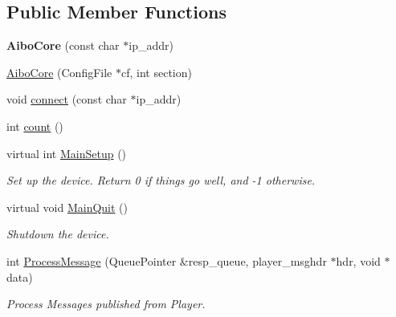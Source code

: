 \subsection*{Public Member Functions}
\begin{DoxyCompactItemize}
\item 
\hypertarget{classAiboCore_a673c057ac82df3fc6c0d828a98408bea}{
{\bfseries AiboCore} (const char $\ast$ip\_\-addr)}
\label{classAiboCore_a673c057ac82df3fc6c0d828a98408bea}

\item 
\hyperlink{classAiboCore_a377640056394d6235609688045288fe7}{AiboCore} (ConfigFile $\ast$cf, int section)
\item 
void \hyperlink{classAiboCore_a078c3b2541d57e7455094ef7c9e46c80}{connect} (const char $\ast$ip\_\-addr)
\item 
int \hyperlink{classAiboCore_a7cf6b6a288291b36254dc29ae089d6bc}{count} ()
\item 
virtual int \hyperlink{classAiboCore_a940aa3f41c521cfc8e1ea69b8a616648}{MainSetup} ()
\begin{DoxyCompactList}\small\item\em Set up the device. Return 0 if things go well, and -\/1 otherwise. \item\end{DoxyCompactList}\item 
\hypertarget{classAiboCore_a4a06b4d7957998e00ffa662ff9345662}{
virtual void \hyperlink{classAiboCore_a4a06b4d7957998e00ffa662ff9345662}{MainQuit} ()}
\label{classAiboCore_a4a06b4d7957998e00ffa662ff9345662}

\begin{DoxyCompactList}\small\item\em Shutdown the device. \item\end{DoxyCompactList}\item 
int \hyperlink{classAiboCore_a2612cdb01d22f3b18fa0c42ec15b4525}{ProcessMessage} (QueuePointer \&resp\_\-queue, player\_\-msghdr $\ast$hdr, void $\ast$data)
\begin{DoxyCompactList}\small\item\em Process Messages published from Player. \item\end{DoxyCompactList}\end{DoxyCompactItemize}
